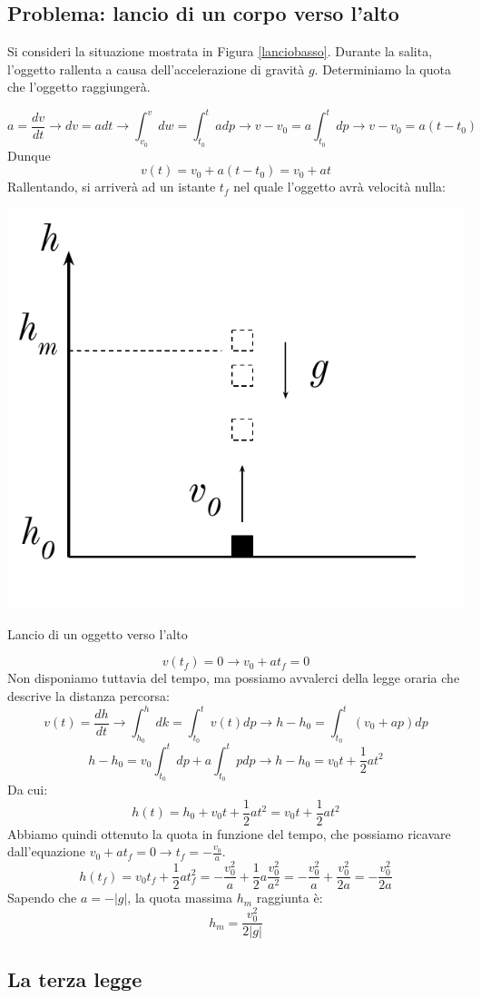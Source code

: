 \subsection*{Problema: lancio di un corpo verso l'alto}
Si consideri la situazione mostrata in Figura \ref{lanciobasso}.
Durante la
salita, l'oggetto rallenta a causa dell'accelerazione di gravità $g$.
Determiniamo la quota che l'oggetto raggiungerà.

\[ a = \frac{dv}{dt} \to dv = adt \to \int_{v_0}^{v}dw = \int_{t_0}^{t}adp \to v - v_0 = a\int_{t_0}^{t}dp \to v - v_0 = a(t - t_0) \]
Dunque
\[ v(t) = v_0 + a(t - t_0) = v_0 + at \]
Rallentando, si arriverà ad un istante $t_f$ nel quale l'oggetto avrà velocità
nulla:
\begin{marginfigure}
    \centering
    \includegraphics[width = \marginparwidth]{figures/greve.pdf}
    \caption{Lancio di un oggetto verso l'alto}
    \label{lanciobasso}
\end{marginfigure}
\[ v(t_f) = 0 \to v_0 + at_f = 0 \]
Non disponiamo tuttavia del tempo, ma possiamo avvalerci della legge oraria
che descrive la distanza percorsa:
\[ v(t) = \frac{dh}{dt} \to \int_{h_0}^{h}dk = \int_{t_0}^{t}v(t)dp \to h - h_0 = \int_{t_0}^{t}(v_0 + ap)dp \]
\[ h - h_0 = v_0\int_{t_0}^{t}dp + a\int_{t_0}^{t}pdp \to h - h_0 = v_0t + \frac12 at^2 \]
Da cui:
\[ h(t) = h_0 + v_0t + \frac12 at^2 = v_0t + \frac12 at^2 \]
Abbiamo quindi ottenuto la quota in funzione del tempo, che possiamo ricavare
dall'equazione $v_0 + at_f = 0 \to t_f = -\frac{v_0}{a}$.
\[ h(t_f) = v_0t_f + \frac12 at_{f}^2 =  -\frac{v_0^2}{a} + \frac{1}{2}a\frac{v_0^2}{a^2} = -\frac{v_0^2}{a} + \frac{v_0^2}{2a} = -\frac{v_0^2}{2a} \]
Sapendo che $a = -|g|$, la quota massima $h_m$ raggiunta è:
\[ h_m = \frac{v_0^2}{2|g|} \]

\subsection{La terza legge}